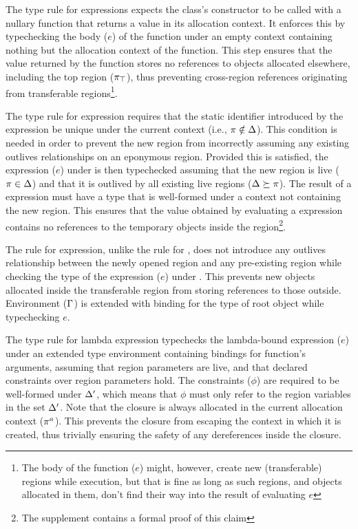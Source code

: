 The type rule for  expressions expects the \RgnZ class's
constructor to be called with a nullary function that returns a value
in its allocation context. It enforces this by typechecking the body
($e$) of the function under an empty context containing nothing but
the allocation context of the function. This step ensures that the
value returned by the function stores no references to objects
allocated elsewhere, including the top region ($\pi_{\top}$), thus
preventing cross-region references originating from transferable
regions\footnote{The body of the function ($e$) might, however, create
new (transferable) regions while execution, but that is fine as long
as such regions, and objects allocated in them, don't find their way
into the result of evaluating $e$}.

The type rule for  expression requires that the static
identifier introduced by the expression be unique under the current
context (i.e., $\pi \notin \Delta$). This condition is needed in
order to prevent the new region from incorrectly assuming any existing
outlives relationships on an eponymous region. Provided this is
satisfied, the expression ($e$) under  is then
typechecked assuming that the new region is live ($\pi \in \Delta$)
and that it is outlived by all existing live regions ($\Delta
\succeq \pi$). The result of a  expression must have a
type that is well-formed under a context not containing the new
region. This ensures that the value obtained by evaluating a
 expression contains no references to the temporary
objects inside the region\footnote{The supplement contains a formal
proof of this claim}.

The rule for  expression, unlike the rule for ,
does not introduce any outlives relationship between the newly opened
region and any pre-existing region while checking the type of the
expression ($e$) under . This prevents new objects allocated
inside the transferable region from storing references to those
outside.  Environment ($\Gamma$) is extended with binding for the type
of root object while typechecking $e$. 

The type rule for lambda expression typechecks
the lambda-bound expression ($e$) under an extended type environment
containing bindings for function's arguments, assuming that region
parameters are live, and that declared constraints over region
parameters hold. The constraints ($\phi$) are required to be
well-formed under $\Delta'$, which means that $\phi$ must only refer
to the region variables in the set $\Delta'$. Note that the closure
is always allocated in the current allocation context ($\pi^a$). This
prevents the closure from escaping the context in which it is created,
thus trivially ensuring the safety of any dereferences inside the
closure.

